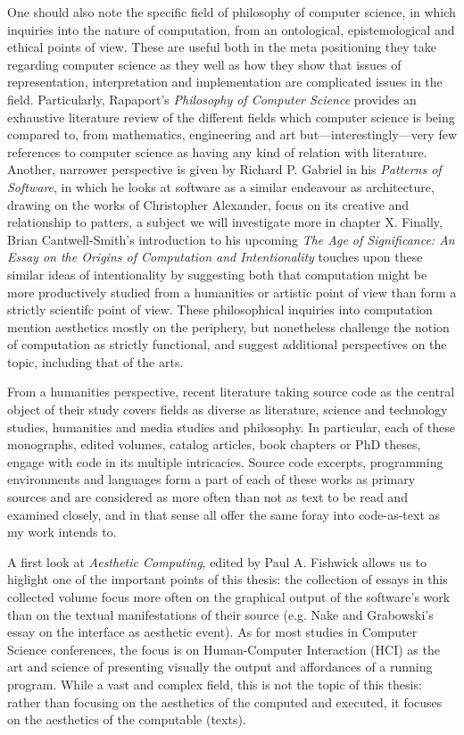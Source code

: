 One should also note the specific field of philosophy of computer science, in which inquiries into the nature of computation, from an ontological, epistemological and ethical points of view. These are useful both in the meta positioning they take regarding computer science as they well as how they show that issues of representation, interpretation and implementation are complicated issues in the field. Particularly, Rapaport's \emph{Philosophy of Computer Science} provides an exhaustive literature review of the different fields which computer science is being compared to, from mathematics, engineering and art but—interestingly—very few references to computer science as having any kind of relation with literature\cite{rapaport_philosophy_2005}. Another, narrower perspective is given by Richard P. Gabriel in his \emph{Patterns of Software}, in which he looks at software as a similar endeavour as architecture, drawing on the works of Christopher Alexander, focus on its creative and relationship to patters, a subject we will investigate more in chapter X. Finally, Brian Cantwell-Smith's introduction to his upcoming \emph{The Age of Significance: An Essay on the Origins of Computation and Intentionality} touches upon these similar ideas of intentionality by suggesting both that computation might be more productively studied from a humanities or artistic point of view than form a strictly scientifc point of view\cite{smith_origin_1998}. These philosophical inquiries into computation mention aesthetics mostly on the periphery, but nonetheless challenge the notion of computation as strictly functional, and suggest additional perspectives on the topic, including that of the arts.

\vspace*{1\baselineskip}

From a humanities perspective, recent literature taking source code as the central object of their study covers fields as diverse as literature, science and technology studies, humanities and media studies and philosophy. In particular, each of these monographs, edited volumes, catalog articles, book chapters or PhD theses, engage with code in its multiple intricacies. Source code excerpts, programming environments and languages form a part of each of these works as primary sources and are considered as more often than not as text to be read and examined closely, and in that sense all offer the same foray into code-as-text as my work intends to.

A first look at \emph{Aesthetic Computing}, edited by Paul A. Fishwick allows us to higlight one of the important points of this thesis: the collection of essays in this collected volume focus more often on the graphical output of the software's work than on the textual manifestations of their source (e.g. Nake and Grabowski's essay on the interface as aesthetic event)\cite{fishwick_aesthetic_2001}. As for most studies in Computer Science conferences, the focus is on Human-Computer Interaction (HCI) as the art and science of presenting visually the output and affordances of a running program. While a vast and complex field, this is not the topic of this thesis: rather than focusing on the aesthetics of the computed and executed, it focuses on the aesthetics of the computable (texts).

